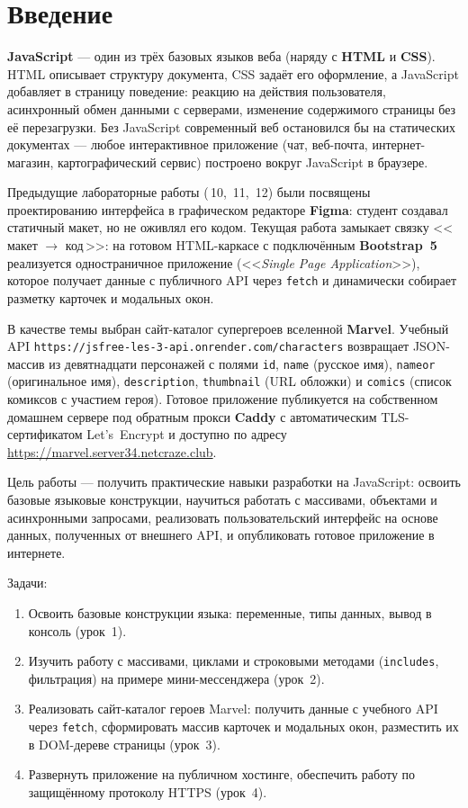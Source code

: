 \chapter*{Введение}
\label{ch:intro}

\textbf{JavaScript} --- один из трёх базовых языков веба (наряду с
\textbf{HTML} и \textbf{CSS}). HTML описывает структуру документа, CSS
задаёт его оформление, а JavaScript добавляет в страницу поведение:
реакцию на действия пользователя, асинхронный обмен данными с
серверами, изменение содержимого страницы без её перезагрузки. Без
JavaScript современный веб остановился бы на статических документах ---
любое интерактивное приложение (чат, веб-почта, интернет-магазин,
картографический сервис) построено вокруг JavaScript в браузере.

Предыдущие лабораторные работы (\textnumero\,10, \textnumero\,11,
\textnumero\,12) были посвящены проектированию интерфейса в графическом
редакторе \textbf{Figma}: студент создавал статичный макет, но не
оживлял его кодом. Текущая работа замыкает связку
<<\,макет \(\to\) код\,>>: на готовом HTML-каркасе с подключённым
\textbf{Bootstrap~5} реализуется одностраничное приложение
(<<\textit{Single Page Application}>>), которое получает данные с
публичного API через \texttt{fetch} и динамически собирает разметку
карточек и модальных окон.

В качестве темы выбран сайт-каталог супергероев вселенной
\textbf{Marvel}. Учебный API
\texttt{https://jsfree-les-3-api.onrender.com/characters} возвращает
JSON-массив из девятнадцати персонажей с полями \texttt{id},
\texttt{name} (русское имя), \texttt{nameor} (оригинальное имя),
\texttt{description}, \texttt{thumbnail} (URL обложки) и
\texttt{comics} (список комиксов с участием героя). Готовое
приложение публикуется на собственном домашнем сервере под обратным
прокси \textbf{Caddy} с автоматическим TLS-сертификатом Let's~Encrypt
и доступно по адресу
\url{https://marvel.server34.netcraze.club}.

Цель работы --- получить практические навыки разработки на JavaScript:
освоить базовые языковые конструкции, научиться работать с массивами,
объектами и асинхронными запросами, реализовать пользовательский
интерфейс на основе данных, полученных от внешнего API, и опубликовать
готовое приложение в интернете.

Задачи:
\begin{enumerate}
  \item Освоить базовые конструкции языка: переменные, типы данных,
        вывод в консоль (урок~1).
  \item Изучить работу с массивами, циклами и строковыми методами
        (\texttt{includes}, фильтрация) на примере мини-мессенджера
        (урок~2).
  \item Реализовать сайт-каталог героев Marvel: получить данные с
        учебного API через \texttt{fetch}, сформировать массив
        карточек и модальных окон, разместить их в DOM-дереве
        страницы (урок~3).
  \item Развернуть приложение на публичном хостинге, обеспечить
        работу по защищённому протоколу HTTPS (урок~4).
\end{enumerate}


